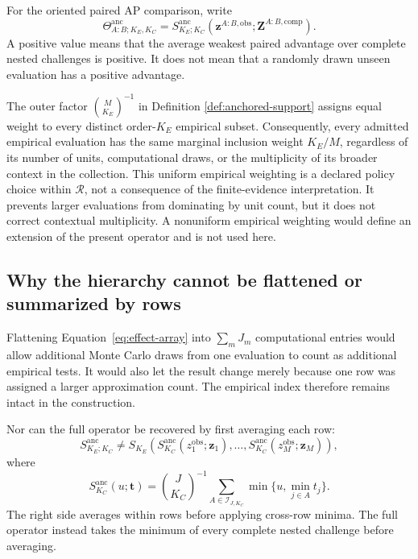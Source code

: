 \documentclass[11pt]{article}
\newcommand{\Regime}{\mathcal{R}}
\newcommand{\Sanc}{S^{\mathrm{anc}}}
\newcommand{\Thetaanc}{\Theta^{\mathrm{anc}}}
\theoremstyle{remark}
\begin{document}
For the oriented paired AP comparison, write
\begin{equation}
\Thetaanc_{A:B;K_E,K_C}
=
\Sanc_{K_E;K_C}
\left(
\mathbf z^{A:B,\mathrm{obs}};
\mathbf Z^{A:B,\mathrm{comp}}
\right).
\label{eq:anchored-paired-support}
\end{equation}
A positive value means that the average weakest paired advantage over complete
nested challenges is positive. It does not mean that a randomly drawn unseen
evaluation has a positive advantage.

The outer factor $\binom{M}{K_E}^{-1}$ in Definition
\ref{def:anchored-support} assigns equal weight to every distinct order-$K_E$
empirical subset. Consequently, every admitted empirical evaluation has the
same marginal inclusion weight $K_E/M$, regardless of its number of units,
computational draws, or the multiplicity of its broader context in the
collection. This uniform empirical weighting is a declared policy choice
within $\Regime$, not a consequence of the finite-evidence interpretation. It
prevents larger evaluations from dominating by unit count, but it does not
correct contextual multiplicity. A nonuniform empirical weighting would define
an extension of the present operator and is not used here.

\subsection{Why the hierarchy cannot be flattened or summarized by rows}

Flattening Equation~\eqref{eq:effect-array} into $\sum_mJ_m$ computational
entries would allow additional Monte Carlo draws from one evaluation to count
as additional empirical tests. It would also let the result change merely
because one row was assigned a larger approximation count. The empirical
index therefore remains intact in the construction.

Nor can the full operator be recovered by first averaging each row:
\begin{equation}
\Sanc_{K_E;K_C}
\ne
S_{K_E}\!\left(
\Sanc_{K_C}(z_1^{\mathrm{obs}};\mathbf z_1),
\ldots,
\Sanc_{K_C}(z_M^{\mathrm{obs}};\mathbf z_M)
\right),
\label{eq:row-noncomposition}
\end{equation}
where
\[
\Sanc_{K_C}(u;\mathbf t)
=
\binom{J}{K_C}^{-1}
\sum_{A\in\mathcal I_{J,K_C}}
\min\{u,\min_{j\in A}t_j\}.
\]
The right side averages within rows before applying cross-row minima. The full
operator instead takes the minimum of every complete nested challenge before
averaging.
\end{document}
